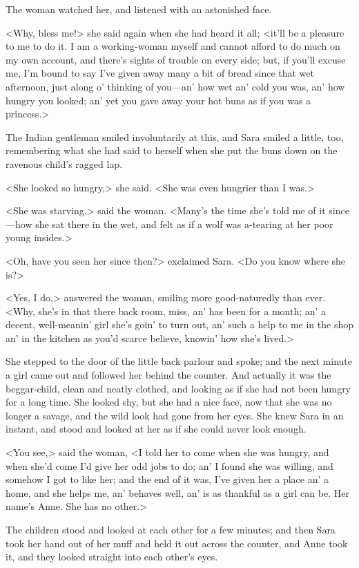 The woman watched her, and listened with an astonished face.

<Why, bless me!> she said again when she had heard it all; <it'll be a pleasure to me to do it. I am a working-woman myself and cannot afford to do much on my own account, and there's sights of trouble on every side; but, if you'll excuse me, I'm bound to say I've given away many a bit of bread since that wet afternoon, just along o' thinking of you—an' how wet an' cold you was, an' how hungry you looked; an' yet you gave away your hot buns as if you was a princess.>

The Indian gentleman smiled involuntarily at this, and Sara smiled a little, too, remembering what she had said to herself when she put the buns down on the ravenous child's ragged lap.

<She looked so hungry,> she said. <She was even hungrier than I was.>

<She was starving,> said the woman. <Many's the time she's told me of it since—how she sat there in the wet, and felt as if a wolf was a-tearing at her poor young insides.>

<Oh, have you seen her since then?> exclaimed Sara. <Do you know where she is?>

<Yes, I do,> answered the woman, smiling more good-naturedly than ever. <Why, she's in that there back room, miss, an' has been for a month; an' a decent, well-meanin' girl she's goin' to turn out, an' such a help to me in the shop an' in the kitchen as you'd scarce believe, knowin' how she's lived.>

She stepped to the door of the little back parlour and spoke; and the next minute a girl came out and followed her behind the counter. And actually it was the beggar-child, clean and neatly clothed, and looking as if she had not been hungry for a long time. She looked shy, but she had a nice face, now that she was no longer a savage, and the wild look had gone from her eyes. She knew Sara in an instant, and stood and looked at her as if she could never look enough.

<You see,> said the woman, <I told her to come when she was hungry, and when she'd come I'd give her odd jobs to do; an' I found she was willing, and somehow I got to like her; and the end of it was, I've given her a place an' a home, and she helps me, an' behaves well, an' is as thankful as a girl can be. Her name's Anne. She has no other.>

The children stood and looked at each other for a few minutes; and then Sara took her hand out of her muff and held it out across the counter, and Anne took it, and they looked straight into each other's eyes.

